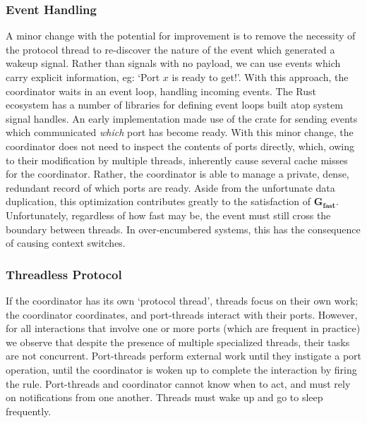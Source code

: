 \subsubsection{Event Handling}
A minor change with the potential for improvement is to remove the necessity of the protocol thread to re-discover the nature of the event which generated a wakeup signal. Rather than signals with no payload, we can use events which carry explicit information, eg: `Port $x$ is ready to get!'. With this approach, the coordinator waits in an event loop, handling incoming events. The Rust ecosystem has a number of libraries for defining event loops built atop system signal handles. An early implementation made use of the  crate for sending events which communicated \textit{which} port has become ready. With this minor change, the coordinator does not need to inspect the contents of ports directly, which, owing to their modification by multiple threads, inherently cause several cache misses for the coordinator. Rather, the coordinator is able to manage a private, dense, redundant record of which ports are ready. Aside from the unfortunate data duplication, this optimization contributes greatly to the satisfaction of $\boldsymbol{G_{fast}}$. Unfortunately, regardless of how fast  may be, the event must still cross the boundary between threads. In over-encumbered systems, this has the consequence of causing context switches.

\subsubsection{Threadless Protocol}
If the coordinator has its own `protocol thread', threads focus on their own work; the coordinator coordinates, and port-threads interact with their ports. However, for all interactions that involve one or more ports (which are frequent in practice) we observe that despite the presence of multiple specialized threads, their tasks are not concurrent. Port-threads perform external work until they instigate a port operation, until the coordinator is woken up to complete the interaction by firing the rule. Port-threads and coordinator cannot know when to act, and must rely on notifications from one another. Threads must wake up and go to sleep frequently. 

